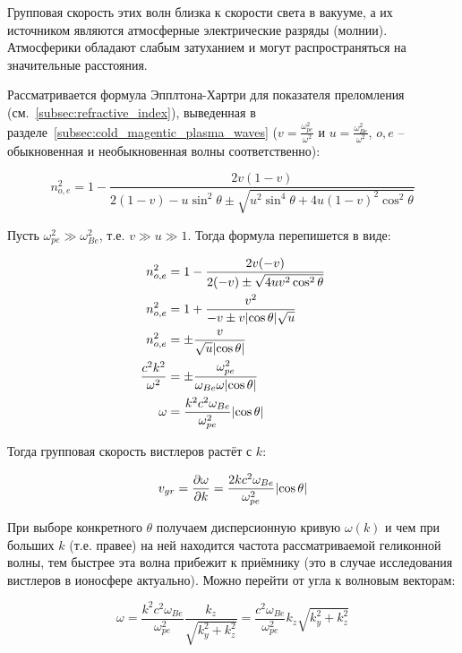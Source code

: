 \documentclass[10pt, a4paper]{article}
\begin{document}
Групповая скорость этих волн близка к скорости света в вакууме, а их источником являются атмосферные электрические разряды (молнии). Атмосферики обладают слабым затуханием и могут распространяться на значительные расстояния. 

Рассматривается формула Эпплтона-Хартри для показателя преломления (см.~\ref{subsec:refractive_index}), выведенная в разделе~\ref{subsec:cold_magentic_plasma_waves} ($v=\frac{\omega_{pe}^2}{\omega^2}$ и $u=\frac{\omega_{Be}^2}{\omega^2}$, $o, e$ -- обыкновенная и необыкновенная волны соответственно):

\begin{equation*}
	n_{o,e}^2=1-\frac{2v(1-v)}{2(1-v)-u\sin^2\theta \pm \sqrt{u^2 \sin^4\theta+4u(1-v)^2 \cos^2\theta}}
\end{equation*}

Пусть $\omega_{pe}^2\gg\omega_{Be}^2$, т.е. $v\gg u \gg 1$. Тогда формула перепишется в виде:

\begin{align*}
	n_{o,e}^2&=1-\frac{2v(-v)}{2(-v)\pm\sqrt{4uv^2 \cos^2\theta}} \\
	n_{o,e}^2&=1+\frac{v^2}{-v\pm v\abs{\cos\theta}\sqrt{u}} \\
	n_{o,e}^2&=\pm \frac{v}{\sqrt{u}\abs{\cos\theta}} \\
	\frac{c^2k^2}{\omega^2} &= \pm\frac{\omega_{pe}^2}{\omega_{Be} \omega\abs{\cos\theta}} \\ 
	\omega &=\frac{k^2c^2\omega_{Be}}{\omega_{pe}^2}\abs{\cos\theta}
\end{align*}

Тогда групповая скорость вистлеров растёт с $k$:

\begin{equation*}
	v_{gr} = \pdv{\omega}{k} = \frac{2kc^2\omega_{Be}}{\omega_{pe}^2}\abs{\cos\theta}
\end{equation*}

При выборе конкретного $\theta$ получаем дисперсионную кривую $\omega(k)$ и чем при больших $k$ (т.е. правее) на ней находится частота рассматриваемой геликонной волны, тем быстрее эта волна прибежит к приёмнику (это в случае исследования вистлеров в ионосфере актуально). Можно перейти от угла к волновым векторам: 

\begin{equation*}
	\omega = \frac{k^2c^2\omega_{Be}}{\omega_{pe}^2} \frac{k_z}{\sqrt{k_y^2+k_z^2}} = \frac{c^2\omega_{Be}}{\omega_{pe}^2}k_z\sqrt{k_y^2+k_z^2}
\end{equation*}
\end{document}
